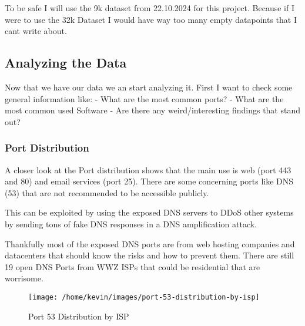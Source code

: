\documentclass[11pt,a4paper]{article}
\begin{document}
\begin{data}
To be safe I will use the 9k dataset from 22.10.2024 for this project. Because if I were to use the 32k Dataset I would have
way too many empty datapoints that I cant write about.

\subsection{Analyzing the Data}
Now that we have our data we an start analyzing it. First I want to check some general information like:
- What are the most common ports?
- What are the most common used Software
- Are there any weird/interesting findings that stand out?

\newpage
\subsubsection{Port Distribution}
A closer look at the Port distribution shows that the main use is web (port 443 and 80) and email services (port 25). There are
some concerning ports like DNS (53) that are not recommended to be accessible publicly.

This can be exploited by using the exposed DNS servers to DDoS other systems by sending tons of fake DNS responses in a DNS amplification attack.

Thankfully most of the exposed DNS ports are from web hosting companies and datacenters that should know the risks and how to prevent them.
There are still 19 open DNS Ports from WWZ ISPs that could be residential that are worrisome.

\begin{figure}[!h]
    \centering
    \texttt{[image: /home/kevin/images/port-53-distribution-by-isp]}
    \caption{Port 53 Distribution by ISP}
    \label{fig:port-53-distribution-by-isp}
\end{figure}


\end{data}
\newpage
\end{document}
